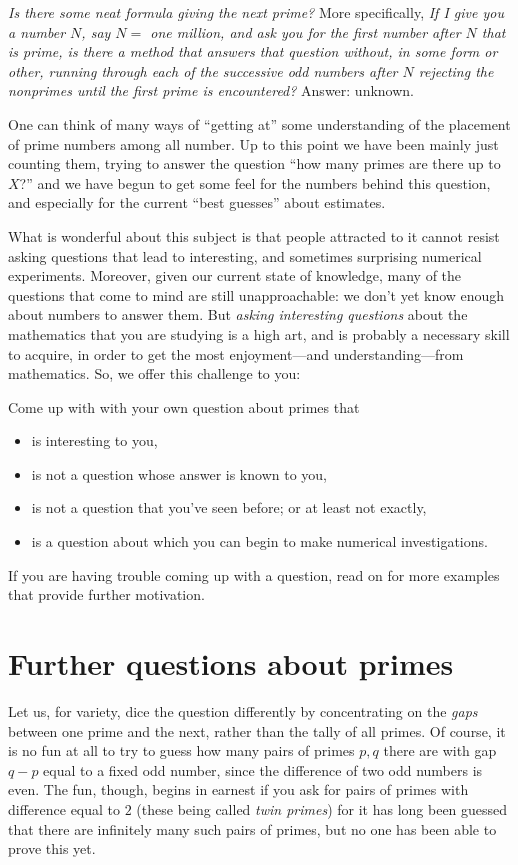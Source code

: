 \documentclass[openany]{book}
\theoremstyle{plain}
\theoremstyle{definition}
\begin{document}
{\em Is there some neat formula giving the next prime?} More
specifically, {\em If I give you a number $N$, say $N=$ one million,
  and ask you for the first number after $N$ that is prime, is there a
  method that answers that question without, in some form or other,
  running through each of the successive odd numbers after $N$ rejecting
  the nonprimes until the first prime is encountered?}  Answer:
unknown.



One can think of many ways of ``getting at'' some understanding of the
placement of prime numbers among all number.  Up to this point we have
been mainly just counting them, trying to answer the question ``how
many primes are there up to $X$?''  and we have begun to get some feel
for the numbers behind this question, and especially for the current
``best guesses'' about estimates.
   

What is wonderful about this subject is that people attracted to it
cannot resist asking questions that lead to interesting, and sometimes
surprising numerical experiments. Moreover, given our current state of
knowledge, many of the questions that come to mind are still
unapproachable: we don't yet know enough about numbers to answer them.
But {\it asking interesting questions} about the mathematics that you
are studying is a high art, and is probably a necessary skill to
acquire, in order to get the most enjoyment---and understanding---from
mathematics.  So, we offer this challenge to you:

Come up with with your own question about primes that
 \begin{itemize}
 \item     is interesting to you,
  \item    is not a question whose answer is known to you,
 \item     is not a question that you've seen before; or at least not exactly,
  \item    is a question about which you can begin to make numerical investigations. 
 \end{itemize}
If you are having trouble coming up with a question, read on for more
examples that  provide further motivation.
 
\chapter{Further questions about primes\label{ch:further}} 

Let us, for variety, dice the question differently by concentrating on
the {\em gaps} between one prime and the next, rather than the tally
of all primes. Of course, it is no fun at all to try to guess how many
pairs of primes $p, q$ there are with gap $q-p$ equal to a fixed odd
number, since the difference of two odd numbers is even.  The fun,
though, begins in earnest if you ask for pairs of primes with
difference equal to $2$ (these being called {\em twin primes}) for it
has long been guessed that there are infinitely many such pairs of
primes, but no one has been able to prove this yet.
\end{document}
